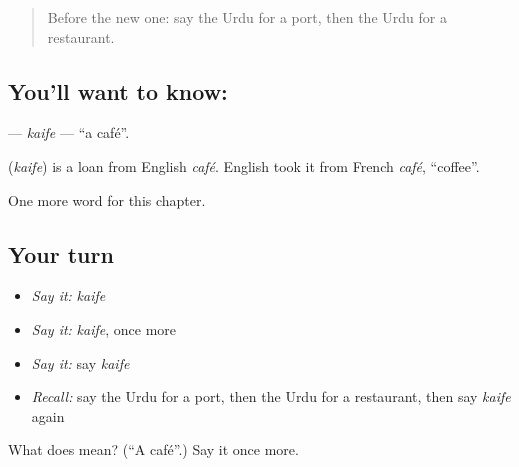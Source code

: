 \label{lesson:UR-C158-kaife}



\begin{quote}
Before the new one: say the Urdu for a port, then the Urdu for a restaurant.
\end{quote}

\subsection*{You'll want to know: }
\textbf{} — \emph{kaife} — \textquotedblleft{}a café\textquotedblright{}.

\begin{cousinweb}
\textbf{} (\emph{kaife}) is a loan from English \emph{café}. English took it from French \emph{café}, \textquotedblleft{}coffee\textquotedblright{}.
\end{cousinweb}

\begin{grammarlens}[title={What you've built}]
One more word for this chapter.
\end{grammarlens}

\subsection*{Your turn}
\begin{itemize}
\raggedright
  \item \emph{Say it:} \emph{kaife}
  \item \emph{Say it:} \emph{kaife}, once more
  \item \emph{Say it:} say \emph{kaife}
  \item \emph{Recall:} say the Urdu for a port, then the Urdu for a restaurant, then say \emph{kaife} again
\end{itemize}

\begin{tcolorbox}[breakable,colback=teal!4,colframe=teal!35!black,title={Before you move on}]
What does  mean? (\textquotedblleft{}A café\textquotedblright{}.) Say it once more.
\end{tcolorbox}
